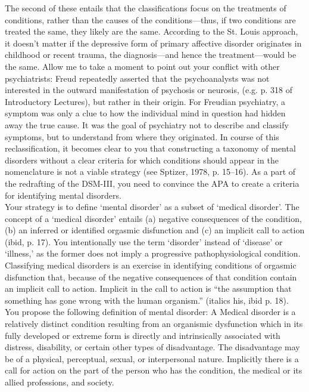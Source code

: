 The second of these entails that the classifications focus on the treatments of conditions, rather than the causes of the conditions—thus, if two conditions are treated the same, they likely are the same. According to the St. Louis approach, it doesn't matter if the depressive form of primary affective disorder originates in childhood or recent trauma, the diagnosis—and hence the treatment—would be the same.
Allow me to take a moment to point out your conflict with other psychiatrists: Freud repeatedly asserted that the psychoanalysts was not interested in the outward manifestation of psychosis or neurosis, (e.g. p. 318 of Introductory Lectures), but rather in their origin. For Freudian psychiatry, a symptom was only a clue to how the individual mind in question had hidden away the true cause. It was the goal of psychiatry not to describe and classify symptoms, but to understand from where they originated.
In course of this reclassification, it becomes clear to you that constructing a taxonomy of mental disorders without a clear criteria for which conditions should appear in the nomenclature is not a viable strategy (see Sptizer, 1978, p. 15--16). As a part of the redrafting of the DSM-III, you need to convince the APA to create a criteria for identifying mental disorders.\\
Your strategy is to define `mental disorder' as a subset of `medical disorder'. The concept of a `medical disorder' entails (a) negative consequences of the condition, (b) an inferred or identified orgasmic disfunction and (c) an implicit call to action (ibid, p. 17). You intentionally use the term `disorder' instead of `disease' or `illness,' as the former does not imply a progressive pathophysiological condition. Classifying medical disorders is an exercise in identifying conditions of orgasmic disfunction that, because of the negative consequences of that condition contain an implicit call to action. Implicit in the call to action is “the assumption that something has gone wrong with the human organism.” (italics his, ibid p. 18).
You propose the following definition of mental disorder:
A Medical disorder is a relatively distinct condition resulting from an organismic dysfunction which in its fully developed or extreme form is directly and intrinsically associated with distress, disability, or certain other types of disadvantage. The disadvantage may be of a physical, perceptual, sexual, or interpersonal nature. Implicitly there is a call for action on the part of the person who has the condition, the medical or its allied professions, and society.
